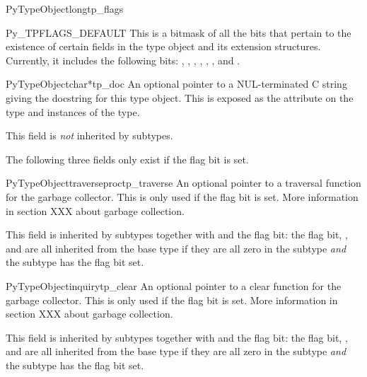 \begin{cmemberdesc}{PyTypeObject}{long}{tp_flags}
  \begin{datadesc}{Py_TPFLAGS_DEFAULT}
    This is a bitmask of all the bits that pertain to the existence of
    certain fields in the type object and its extension structures.
    Currently, it includes the following bits:
    ,
    ,
    ,
    ,
    ,
    , and
    .
  \end{datadesc}
\end{cmemberdesc}

\begin{cmemberdesc}{PyTypeObject}{char*}{tp_doc}
  An optional pointer to a NUL-terminated C string giving the
  docstring for this type object.  This is exposed as the
   attribute on the type and instances of the type.

  This field is \emph{not} inherited by subtypes.
\end{cmemberdesc}

The following three fields only exist if the
 flag bit is set.

\begin{cmemberdesc}{PyTypeObject}{traverseproc}{tp_traverse}
  An optional pointer to a traversal function for the garbage
  collector.  This is only used if the 
  flag bit is set.  More information in section XXX about garbage
  collection.

  This field is inherited by subtypes together with 
  and the  flag bit: the flag bit,
  , and  are all inherited from
  the base type if they are all zero in the subtype \emph{and} the
  subtype has the  flag bit set.
\end{cmemberdesc}

\begin{cmemberdesc}{PyTypeObject}{inquiry}{tp_clear}
  An optional pointer to a clear function for the garbage collector.
  This is only used if the  flag bit is
  set.  More information in section XXX about garbage collection.

  This field is inherited by subtypes together with 
  and the  flag bit: the flag bit,
  , and  are all inherited from
  the base type if they are all zero in the subtype \emph{and} the
  subtype has the  flag bit set.
\end{cmemberdesc}

